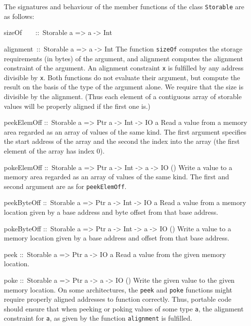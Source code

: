 \documentclass[a4paper,twoside]{article}
\makeatletter
\newcommand{\code}[1]{\texttt{#1}}      %
\newenvironment{codedesc}{%
  \list{}{\labelwidth\z@
    \let\makelabel\codedesclabel}
  }{%
  \endlist
  }
\newcommand*{\codedesclabel}[1]{%
  \hspace{-\leftmargin}
  \parbox[b]{\labelwidth}{\makebox[0pt][l]{\code{#1}}\\}\hfil\relax
  }
\newcommand{\combineitems}{\vspace*{-\itemsep}\vspace*{-\parsep}\vspace*{-1em}}
\makeatother
\begin{document}
The signatures and behaviour of the member functions of the class
\code{Storable} are as follows:
%
\begin{codedesc}
\item[sizeOf~~~~::\ Storable a => a -> Int]
\item[alignment~::\ Storable a => a -> Int]\combineitems The function
  \code{sizeOf} computes the storage requirements (in bytes) of the argument,
  and alignment computes the alignment constraint of the argument.  An
  alignment constraint \code{x} is fulfilled by any address divisible by
  \code{x}. Both functions do not evaluate their argument, but compute the
  result on the basis of the type of the argument alone.  We require that the
  size is divisible by the alignment.  (Thus each element of a contiguous
  array of storable values will be properly aligned if the first one is.)

\item[peekElemOff ::\ Storable a => Ptr a -> Int -> IO a] Read a value from a
  memory area regarded as an array of values of the same kind. The first
  argument specifies the start address of the array and the second the index
  into the array (the first element of the array has index 0).
  
\item[pokeElemOff ::\ Storable a => Ptr a -> Int -> a -> IO ()] Write a value
  to a memory area regarded as an array of values of the same kind.  The first
  and second argument are as for \code{peekElemOff}.
  
\item[peekByteOff ::\ Storable a => Ptr a -> Int -> IO a] Read a value from a
  memory location given by a base address and byte offset from that base
  address.
  
\item[pokeByteOff ::\ Storable a => Ptr a -> Int -> a -> IO ()] Write a value
  to a memory location given by a base address and offset from that base
  address.
  
\item[peek ::\ Storable a => Ptr a -> IO a] Read a value from the given memory
  location.
  
\item[poke ::\ Storable a => Ptr a -> a -> IO ()] Write the given value to the
  given memory location.
\end{codedesc}
%
On some architectures, the \code{peek} and \code{poke} functions might require
properly aligned addresses to function correctly.  Thus, portable code should
ensure that when peeking or poking values of some type \code{a}, the alignment
constraint for \code{a}, as given by the function \code{alignment} is
fulfilled.
\end{document}
